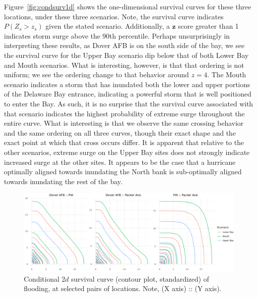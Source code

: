 Figure~\ref{fig:condsurv1d} shows the one-dimensional survival curves for these three locations, under 
    these three scenarios.  Note, the survival curve indicates $P(Z_s > z_s)$ given the stated scenario.
    Additionally, a $\bm{z}$ score greater than 1 indicates storm surge above the 90th percentile.
    Perhaps unsurprisingly in interpreting these results, as Dover AFB is on the south side of the bay, 
    we see the survival curve for the Upper Bay scenario dip below that of both Lower Bay and Mouth scenarios.  
    What is interesting, however, is that that ordering is not uniform; we see the ordering change to that
    behavior around $z = 4$.  The Mouth scenario indicates a storm that has inundated both the lower and
    upper portions of the Delaware Bay entrance, indicating a powerful storm that is well positioned
    to enter the Bay.  As such, it is no surprise that the survival curve associated with that scenario
    indicates the highest probability of extreme surge throughout the entire curve.  What is interesting is that
    we observe the same crossing behavior and the same ordering on all three curves, though their exact shape
    and the exact point at which that cross occurs differ.  It is apparent that relative to the other
    scenarios, extreme surge on the Upper Bay sites does not strongly indicate increased surge at the other 
    sites.  It appears to be the case that a hurricane optimally aligned towards inundating the North bank is 
    sub-optimally aligned towards inundating the rest of the bay.

\begin{figure}[tb]
    \centering
    \includegraphics[width=.95\linewidth]{plots/condsurv/condsurv_2d_mcmc.png}
    \caption{Conditional 2$d$ survival curve (contour plot, standardized) of flooding, at selected 
        pairs of locations. Note, (X axis) :: (Y axis).\label{fig:condsurv2d}}
\end{figure}

